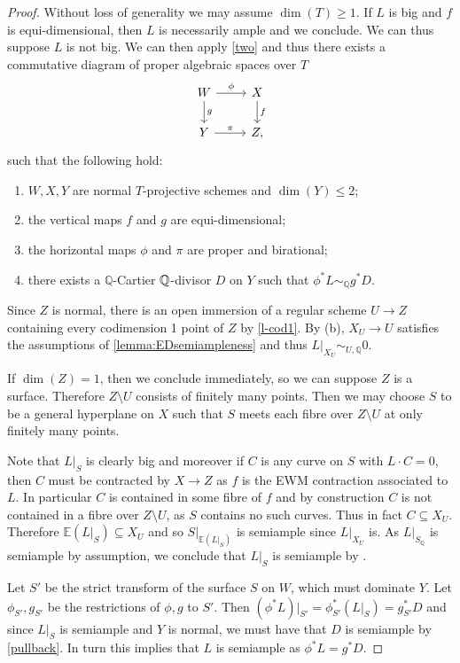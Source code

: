 \begin{proof}
	Without loss of generality we may assume $\dim(T)\geq 1$. If $L$ is big and $f$ is equi-dimensional, then $L$ is necessarily ample and we conclude.
	We can thus suppose $L$ is not big. We can then apply \autoref{two} and thus there exists a commutative diagram of proper algebraic spaces over $T$
	\[\begin{tikzcd}
	W \arrow[d, "g"] \arrow[r, "\phi"] & X \arrow[d, "f"] \\
	Y \arrow[r, "\pi"]             & Z  ,                
	\end{tikzcd}\]	
	such that the following hold:
	
	\begin{enumerate}
		\item $W,X,Y$ are normal $T$-projective schemes and $\dim (Y) \leq 2$;
		\item the vertical maps $f$ and $g$ are equi-dimensional;
		\item the horizontal maps $\phi$ and $\pi$ are proper and birational;
		\item there exists a $\mathbb{Q}$-Cartier $\mathbb{Q}$-divisor $D$ on $Y$ such that $\phi^{*}L \sim_{\mathbb{Q}} g^{*}D$.
	\end{enumerate}
	Since $Z$ is normal, there is an open immersion of a regular scheme $U \to Z$ containing every codimension 1 point of $Z$ by \autoref{l-cod1}.
	By (b), $X_{U} \to U$ satisfies the assumptions of \autoref{lemma:EDsemiampleness} and thus $L|_{X_{U}} \sim_{U,\mathbb{Q}} 0$. 
	
	If $\dim(Z)=1$, then we conclude immediately, so we can suppose $Z$ is a surface. Therefore $Z \setminus U$ consists of finitely many points.  
	Then we may choose $S$ to be a general hyperplane on $X$ such that $S$ meets each fibre over $Z \setminus U$ at only finitely many points. 
	
	Note that $L|_{S}$ is clearly big and moreover if $C$ is any curve on $S$ with $L \cdot C =0$, then $C$ must be contracted by $X \to Z$ as $f$ is the EWM contraction associated to $L$. In particular $C$ is contained in some fibre of $f$ and by construction $C$ is not contained in a fibre over $Z \setminus U$, as $S$ contains no such curves. Thus in fact $C \subseteq X_{U}$. Therefore $\mathbb{E}(L|_{S}) \subseteq X_{U}$ and so $S|_{\mathbb{E}(L|_{S})}$ is semiample since $L|_{X_{U}}$ is. As $L|_{S_{\mathbb{Q}}}$ is semiample by assumption, we conclude that $L|_{S}$ is semiample by \cite[Theorem 6.1]{witaszek2020keels}. 
	
	Let $S'$ be the strict transform of the surface $S$ on $W$, which must dominate $Y$. Let $\phi_{S'}, g_{S'}$ be the restrictions of $\phi, g$ to $S'$. Then $(\phi^{*}L)|_{S'}=\phi_{S'}^{*}(L|_{S})=g_{S'}^{*}D$ and since $L|_{S}$ is semiample and $Y$ is normal, we must have that $D$ is semiample by \autoref{pullback}. In turn this implies that $L$ is semiample as $\phi^{*}L=g^{*}D$.	
\end{proof}	

